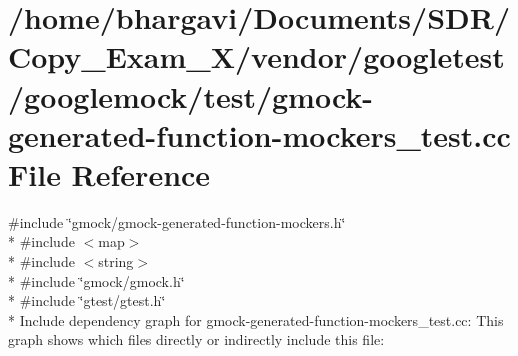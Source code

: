 \hypertarget{gmock-generated-function-mockers__test_8cc}{}\section{/home/bhargavi/\+Documents/\+S\+D\+R/\+Copy\+\_\+\+Exam\+\_\+X/vendor/googletest/googlemock/test/gmock-\/generated-\/function-\/mockers\+\_\+test.cc File Reference}
\label{gmock-generated-function-mockers__test_8cc}
{\ttfamily \#include \char`\"{}gmock/gmock-\/generated-\/function-\/mockers.\+h\char`\"{}}\\*
{\ttfamily \#include $<$map$>$}\\*
{\ttfamily \#include $<$string$>$}\\*
{\ttfamily \#include \char`\"{}gmock/gmock.\+h\char`\"{}}\\*
{\ttfamily \#include \char`\"{}gtest/gtest.\+h\char`\"{}}\\*
Include dependency graph for gmock-\/generated-\/function-\/mockers\+\_\+test.cc\+:
This graph shows which files directly or indirectly include this file\+:
